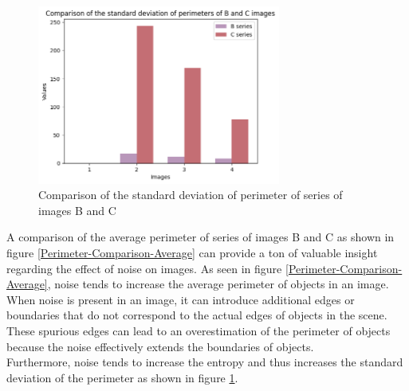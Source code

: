 \documentclass[runningheads]{llncs}
\begin{document}
\begin{figure}
\includegraphics[width=8cm]{Report/Result_Images/bar_plot_4.png}
\centering
\caption{Comparison of the standard deviation of perimeter of series of images B and C}
\label{Perimeter-Comparison-Standard Deviation}
\end{figure}


A comparison of the average perimeter of series of images B and C as shown in figure \ref{Perimeter-Comparison-Average} can provide a ton of valuable insight regarding the effect of noise on images. As seen in figure \ref{Perimeter-Comparison-Average}, noise tends to increase the average perimeter of objects in an image. When noise is present in an image, it can introduce additional edges or boundaries that do not correspond to the actual edges of objects in the scene. These spurious edges can lead to an overestimation of the perimeter of objects because the noise effectively extends the boundaries of objects.
~\\ Furthermore, noise tends to increase the entropy and thus increases the standard deviation of the perimeter as shown in figure \ref{Perimeter-Comparison-Standard Deviation}.
\end{document}
